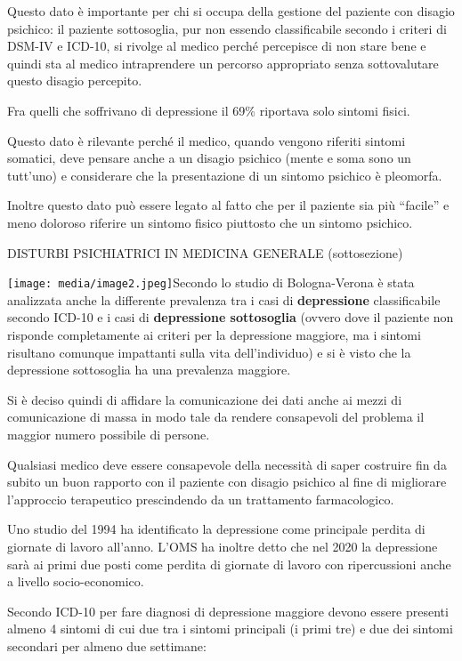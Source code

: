 \documentclass[]{article}
\begin{document}
Questo dato è importante per chi si occupa della gestione del paziente
con disagio psichico: il paziente sottosoglia, pur non essendo
classificabile secondo i criteri di DSM-IV e ICD-10, si rivolge al
medico perché percepisce di non stare bene e quindi sta al medico
intraprendere un percorso appropriato senza sottovalutare questo disagio
percepito.

Fra quelli che soffrivano di depressione il 69\% riportava solo sintomi
fisici.

Questo dato è rilevante perché il medico, quando vengono riferiti
sintomi somatici, deve pensare anche a un disagio psichico (mente e soma
sono un tutt'uno) e considerare che la presentazione di un sintomo
psichico è pleomorfa.

Inoltre questo dato può essere legato al fatto che per il paziente sia
più ``facile'' e meno doloroso riferire un sintomo fisico piuttosto che
un sintomo psichico.

DISTURBI PSICHIATRICI IN MEDICINA GENERALE (sottosezione)

\texttt{[image: media/image2.jpeg]}Secondo
lo studio di Bologna-Verona è stata analizzata anche la differente
prevalenza tra i casi di \textbf{depressione} classificabile secondo
ICD-10 e i casi di \textbf{depressione sottosoglia} (ovvero dove il
paziente non risponde completamente ai criteri per la depressione
maggiore, ma i sintomi risultano comunque impattanti sulla vita
dell'individuo) e si è visto che la depressione sottosoglia ha una
prevalenza maggiore.

Si è deciso quindi di affidare la comunicazione dei dati anche ai mezzi
di comunicazione di massa in modo tale da rendere consapevoli del
problema il maggior numero possibile di persone.

Qualsiasi medico deve essere consapevole della necessità di saper
costruire fin da subito un buon rapporto con il paziente con disagio
psichico al fine di migliorare l'approccio terapeutico prescindendo da
un trattamento farmacologico.

Uno studio del 1994 ha identificato la depressione come principale
perdita di giornate di lavoro all'anno. L'OMS ha inoltre detto che nel
2020 la depressione sarà ai primi due posti come perdita di giornate di
lavoro con ripercussioni anche a livello socio-economico.

Secondo ICD-10 per fare diagnosi di depressione maggiore devono essere
presenti almeno 4 sintomi di cui due tra i sintomi principali (i primi
tre) e due dei sintomi secondari per almeno due settimane:
\end{document}
